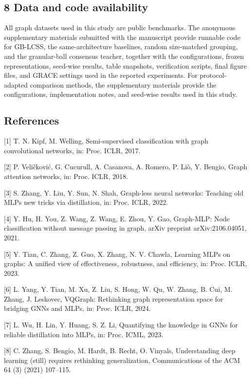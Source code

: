 \subsection{8 Data and code availability}\label{data-and-code-availability}

All graph datasets used in this study are public benchmarks. The anonymous supplementary materials submitted with the manuscript provide runnable code for GB-LCSS, the same-architecture baselines, random size-matched grouping, and the granular-ball consensus teacher, together with the configurations, frozen representations, seed-wise results, table snapshots, verification scripts, final figure files, and GRACE settings used in the reported experiments. For protocol-adapted comparison methods, the supplementary materials provide the configurations, implementation notes, and seed-wise results used in this study.

\subsection{References}\label{references}

{[}1{]} T. N. Kipf, M. Welling, Semi-supervised classification with graph convolutional networks, in: Proc. ICLR, 2017.

{[}2{]} P. Veličković, G. Cucurull, A. Casanova, A. Romero, P. Liò, Y. Bengio, Graph attention networks, in: Proc. ICLR, 2018.

{[}3{]} S. Zhang, Y. Liu, Y. Sun, N. Shah, Graph-less neural networks: Teaching old MLPs new tricks via distillation, in: Proc. ICLR, 2022.

{[}4{]} Y. Hu, H. You, Z. Wang, Z. Wang, E. Zhou, Y. Gao, Graph-MLP: Node classification without message passing in graph, arXiv preprint arXiv:2106.04051, 2021.

{[}5{]} Y. Tian, C. Zhang, Z. Guo, X. Zhang, N. V. Chawla, Learning MLPs on graphs: A unified view of effectiveness, robustness, and efficiency, in: Proc. ICLR, 2023.

{[}6{]} L. Yang, Y. Tian, M. Xu, Z. Liu, S. Hong, W. Qu, W. Zhang, B. Cui, M. Zhang, J. Leskovec, VQGraph: Rethinking graph representation space for bridging GNNs and MLPs, in: Proc. ICLR, 2024.

{[}7{]} L. Wu, H. Lin, Y. Huang, S. Z. Li, Quantifying the knowledge in GNNs for reliable distillation into MLPs, in: Proc. ICML, 2023.

{[}8{]} C. Zhang, S. Bengio, M. Hardt, B. Recht, O. Vinyals, Understanding deep learning (still) requires rethinking generalization, Communications of the ACM 64 (3) (2021) 107--115.


